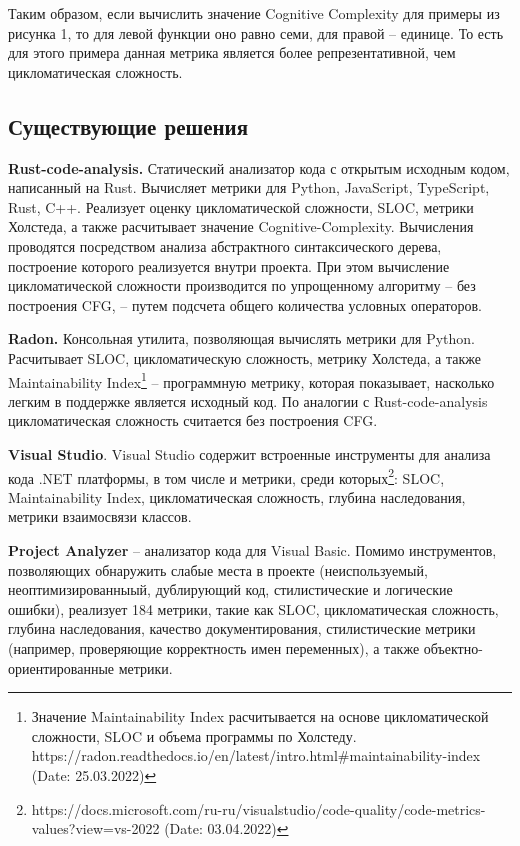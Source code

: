 Таким образом, если вычислить значение Cognitive Complexity для примеры из
рисунка 1, то для левой функции оно равно семи, для правой -- единице. То
есть для этого примера данная метрика является более репрезентативной, чем цикломатическая 
сложность.
\newpage
\subsection{Существующие решения}
\textbf{Rust-code-analysis.} Статический анализатор кода с открытым исходным кодом, написанный на Rust. Вычисляет метрики для Python, JavaScript, TypeScript, Rust, C++. Реализует оценку 
цикломатической сложности, SLOC, метрики Холстеда, а также расчитывает значение Cognitive-Complexity. Вычисления проводятся посредством анализа абстрактного синтаксического дерева, построение которого
реализуется внутри проекта. При этом вычисление цикломатической сложности
производится по упрощенному алгоритму -- без построения CFG, -- путем подсчета
общего количества условных операторов.

\textbf{Radon.} Консольная утилита, позволяющая вычислять метрики для Python. Расчитывает SLOC, цикломатическую сложность, метрику Холстеда, а также Maintainability Index\footnote{Значение Maintainability Index расчитывается на основе цикломатической сложности, SLOC и объема программы по Холстеду. https://radon.readthedocs.io/en/latest/intro.html\#maintainability-index (Date: 25.03.2022)} -- программную метрику, которая показывает, насколько 
легким в поддержке является исходный код. По аналогии с Rust-code-analysis 
цикломатическая сложность считается без построения CFG.

\textbf{Visual Studio}. Visual Studio содержит
встроенные инструменты для анализа кода .NET
платформы, в том числе и метрики, среди которых\footnote{https://docs.microsoft.com/ru-ru/visualstudio/code-quality/code-metrics-values?view=vs-2022 (Date: 03.04.2022)}:
SLOC, Maintainability Index, цикломатическая сложность, глубина наследования, метрики взаимосвязи
классов.

\textbf{Project Analyzer} -- анализатор кода для Visual Basic. Помимо инструментов, позволяющих обнаружить слабые места в проекте (неиспользуемый, неоптимизированныый, дублирующий  код, стилистические и логические ошибки), реализует 184 метрики, такие как SLOC, цикломатическая сложность, глубина наследования, качество документирования, стилистические метрики (например, проверяющие корректность имен переменных), а также объектно-ориентированные метрики.
